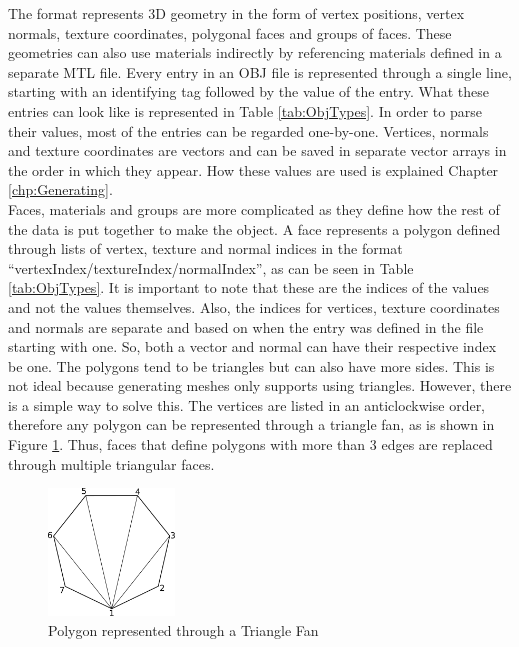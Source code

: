 The format represents 3D geometry in the form of vertex positions, vertex normals, texture coordinates, polygonal faces and groups of faces. These geometries can also use materials indirectly by referencing materials defined in a separate \acs{MTL} file. Every entry in an OBJ file is represented through a single line, starting with an identifying tag followed by the value of the entry. What these entries can look like is represented in Table \ref{tab:ObjTypes}.
In order to parse their values, most of the entries can be regarded one-by-one. Vertices, normals and texture coordinates are vectors and can be saved in separate vector arrays in the order in which they appear. How these values are used is explained Chapter \ref{chp:Generating}.\\
Faces, materials and groups are more complicated as they define how the rest of the data is put together to make the object. A face represents a polygon defined through lists of vertex, texture and normal indices in the format ``vertexIndex/textureIndex/normalIndex'', as can be seen in Table \ref{tab:ObjTypes}. It is important to note that these are the indices of the values and not the values themselves. Also, the indices for vertices, texture coordinates and normals are separate and based on when the entry was defined in the file starting with one. So, both a vector and normal can have their respective index be one. The polygons tend to be triangles but can also have more sides. This is not ideal because generating meshes only supports using triangles. However, there is a simple way to solve this. The vertices are listed in an anticlockwise order, therefore any polygon can be represented through a triangle fan, as is shown in Figure \ref{fig:TriangleFan}. Thus, faces that define polygons with more than 3 edges are replaced through multiple triangular faces.

\begin{figure}[htpb]
	\centering
	\includegraphics[width=0.3\textwidth]{fig/TriangleFan.pdf}
	\caption[OBJ Polygon to Triangle Fan]{Polygon represented through a Triangle Fan\protect}
	\label{fig:TriangleFan}
\end{figure}

